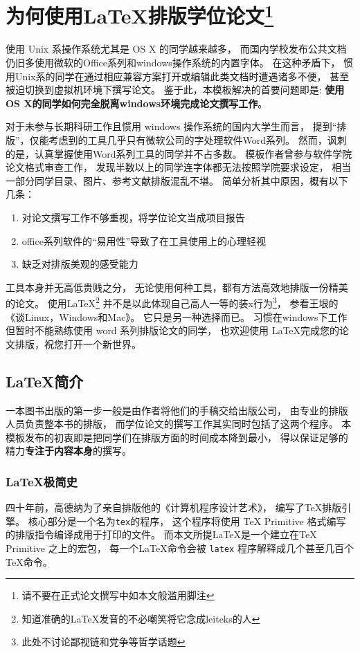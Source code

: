 
\chapter{为何使用\LaTeX 排版学位论文\footnote{请不要在正式论文撰写中如本文般滥用脚注}}

使用 Unix 系操作系统尤其是 OS X 的同学越来越多，
而国内学校发布公共文档仍旧多使用微软的Office系列和windows操作系统的内置字体。
在这种矛盾下，
惯用Unix系的同学在通过相应兼容方案打开或编辑此类文档时遭遇诸多不便，
甚至被迫切换到虚拟机环境下撰写论文。
鉴于此，本模板解决的首要问题即是:
\textbf{使用OS X的同学如何完全脱离windows环境完成论文撰写工作}。

对于未参与长期科研工作且惯用 windows 操作系统的国内大学生而言，
提到“排版”，仅能考虑到的工具几乎只有微软公司的字处理软件Word系列。
然而，讽刺的是，认真掌握使用Word系列工具的同学并不占多数。
模板作者曾参与软件学院论文格式审查工作，
发现半数以上的同学连字体都无法按照学院要求设定，
相当一部分同学目录、图片、参考文献排版混乱不堪。
简单分析其中原因，概有以下几条：
\begin{enumerate}
    \item 对论文撰写工作不够重视，将学位论文当成项目报告
    \item office系列软件的“易用性”导致了在工具使用上的心理轻视
    \item 缺乏对排版美观的感受能力
\end{enumerate}

工具本身并无高低贵贱之分，
无论使用何种工具，都有方法高效地排版一份精美的论文。
使用\LaTeX \footnote{知道准确的\LaTeX 发音的不必嘲笑将它念成leiteks的人}
并不是以此体现自己高人一等的装x行为\footnote{此处不讨论鄙视链和党争等哲学话题}，
参看王垠的《谈Linux，Windows和Mac》\cite{wangyin}。
它只是另一种选择而已。
习惯在windows下工作但暂时不能熟练使用 word 系列排版论文的同学，
也欢迎使用 \LaTeX 完成您的论文排版，祝您打开一个新世界。

\section{\LaTeX  简介}
一本图书出版的第一步一般是由作者将他们的手稿交给出版公司，
由专业的排版人员负责整本书的排版，
而学位论文的撰写工作其实同时包括了这两个程序。
本模板发布的初衷即是把同学们在排版方面的时间成本降到最小，
得以保证足够的精力\textbf{专注于内容本身}的撰写。

\subsection{\LaTeX 极简史}
四十年前，高德纳为了亲自排版他的《计算机程序设计艺术》，
编写了\TeX 排版引擎。
核心部分是一个名为\texttt{tex}的程序，
这个程序将使用 TeX Primitive 格式编写的排版指令编译成用于打印的文件。
而本文所提\LaTeX 是一个建立在TeX Primitive 之上的宏包，
每一个\LaTeX 命令会被 \texttt{latex} 程序解释成几个甚至几百个\TeX 命令。

